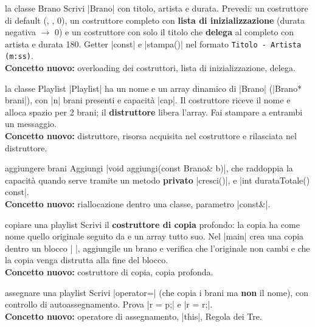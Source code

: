 \begin{step}{la classe Brano}
Scrivi \cc|Brano| con titolo, artista e durata. Prevedi: un costruttore di default
(, , 0), un costruttore completo con \textbf{lista di inizializzazione}
(durata negativa $\to$ 0) e un costruttore con solo il titolo che
\textbf{delega} al completo con artista  e durata 180. Getter
\cc|const| e \cc|stampa()| nel formato \texttt{Titolo - Artista (m:ss)}.\\[0.3em]
\textbf{Concetto nuovo:} overloading dei costruttori, lista di inizializzazione, delega.
\end{step}

\begin{step}{la classe Playlist}
\cc|Playlist| ha un nome e un array dinamico di \cc|Brano| (\cc|Brano* brani|), con
\cc|n| brani presenti e capacità \cc|cap|. Il costruttore riceve il nome e alloca
spazio per 2 brani; il \textbf{distruttore} libera l'array. Fai stampare a entrambi
un messaggio.\\[0.3em]
\textbf{Concetto nuovo:} distruttore, risorsa acquisita nel costruttore e
rilasciata nel distruttore.
\end{step}

\begin{step}{aggiungere brani}
Aggiungi \cc|void aggiungi(const Brano& b)|, che raddoppia la capacità quando
serve tramite un metodo \textbf{privato} \cc|cresci()|, e \cc|int durataTotale() const|.\\[0.3em]
\textbf{Concetto nuovo:} riallocazione dentro una classe, parametro \cc|const&|.
\end{step}

\begin{step}{copiare una playlist}
Scrivi il \textbf{costruttore di copia} profondo: la copia ha come nome quello
originale seguito da  e un array tutto suo. Nel \cc|main| crea una
copia dentro un blocco \cc|{ }|, aggiungile un brano e verifica che l'originale
non cambi e che la copia venga distrutta alla fine del blocco.\\[0.3em]
\textbf{Concetto nuovo:} costruttore di copia, copia profonda.
\end{step}

\begin{step}{assegnare una playlist}
Scrivi \cc|operator=| (che copia i brani ma \textbf{non} il nome), con controllo di
autoassegnamento. Prova \cc|r = p;| e \cc|r = r;|.\\[0.3em]
\textbf{Concetto nuovo:} operatore di assegnamento, \cc|this|, Regola dei Tre.
\end{step}

